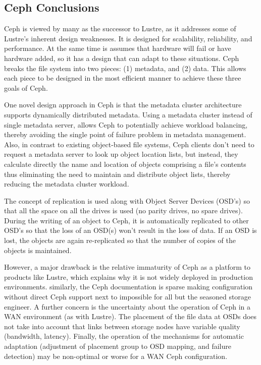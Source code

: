 \documentclass[11pt]{article}
\begin{document}
\subsection{Ceph Conclusions}
Ceph is viewed by many as the successor to Lustre, as it addresses 
some of Lustre's inherent design weaknesses. It is designed for 
scalability, reliability, and performance. At the same time is assumes 
that hardware will fail or have hardware added, so it has a design that 
can adapt to these situations. Ceph breaks the file system into two 
pieces: (1) metadata, and (2) data. This allows each piece to be 
designed in the most efficient manner to achieve these three goals of 
Ceph.

One novel design approach in Ceph is that the metadata cluster 
architecture supports dynamically distributed metadata. Using a 
metadata cluster instead of single metadata server, allows Ceph to 
potentially achieve workload balancing, thereby avoiding the single 
point of failure problem in metadata management. Also, in contrast 
to existing object-based file systems, Ceph clients don’t need to 
request a metadata server to look up object location lists, but instead, 
they calculate directly the name and location of objects comprising a 
file’s contents thus eliminating the need to maintain and distribute 
object lists, thereby reducing the metadata cluster workload.

The concept of replication is used along with Object Server Devices 
(OSD’s) so that all the space on all the drives is used (no parity 
drives, no spare drives). During the writing of an object to Ceph, 
it is automatically replicated to other OSD’s so that the loss of 
an OSD(s) won’t result in the loss of data. If an OSD is lost, the 
objects are again re-replicated so that the number of copies of the 
objects is maintained.

However, a major drawback is the relative immaturity of Ceph as a 
platform to products like Lustre, which explains why it is not widely 
deployed in production environments. similarly, the Ceph documentation 
is sparse making configuration without direct Ceph support next to 
impossible for all but the seasoned storage engineer. A further 
concern is the uncertainty about the operation of Ceph in a WAN 
environment (as with Lustre). The placement of the file data at OSDs 
does not take into account that links between storage nodes have 
variable quality (bandwidth, latency). Finally, the operation of the 
mechanisms for automatic adaptation (adjustment of placement group to 
OSD mapping, and failure detection) may be non-optimal or worse for a 
WAN Ceph configuration.
\end{document}
